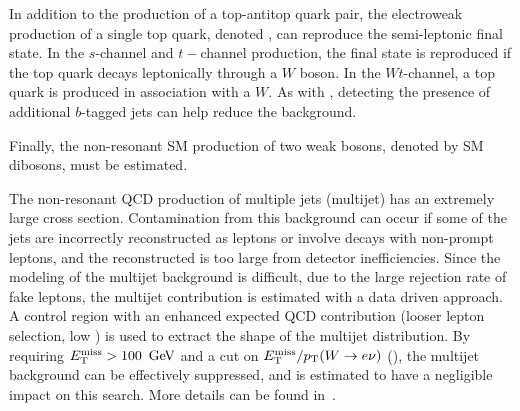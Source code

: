 In addition to the production of a top-antitop quark pair, the electroweak production of a single top quark, denoted \Singlet, can reproduce the semi-leptonic final state. In the $s$-channel and $t-$channel production, the final state is reproduced if the top quark decays leptonically through a $W$ boson. In the $Wt$-channel, a top quark is produced in association with a $W$. As with \ttbar, detecting the presence of additional $b$-tagged jets can help reduce the \Singlet background.

Finally, the non-resonant SM production of two weak bosons, denoted by SM dibosons, must be estimated. 

The non-resonant QCD production of multiple jets (multijet) has an extremely large cross section. Contamination from this background can occur if some of the jets are incorrectly reconstructed as leptons or involve decays with non-prompt leptons, and the reconstructed \MET is too large from detector inefficiencies. Since the modeling of the multijet background is difficult, due to the large rejection rate of fake leptons, the multijet contribution is estimated with a data driven approach. A control region with an enhanced expected QCD contribution (looser lepton selection, low \MET) is used to extract the shape of the multijet distribution. By requiring $\MET>100\,\GeV$ and a cut on $E_{\text{T}}^{\text{miss}}/p_{\text{T}}(W\rightarrow e\nu)$ (\Ch{\ref{ch:event_selection}}), the multijet background can be effectively suppressed, and is estimated to have a negligible impact on this search. More details can be found in~\App{\ref{ch:qcd}}.


